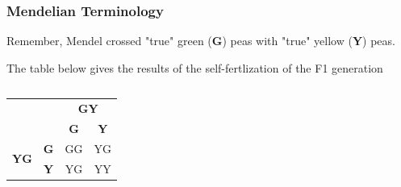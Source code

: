 \documentclass{beamer}
\begin{document}
\begin{frame}
	\frametitle{Mendelian Terminology}

	
	 Remember, Mendel crossed "true" green (\textbf{G}) peas with "true" yellow (\textbf{Y}) peas.

\bigskip

	The table below gives the results of the self-fertlization of the F1 generation\\
	
	\bigskip	
\begin{columns}	
	\begin{column}{0.5\textwidth}


\begin{tabular}{c|c|c|c|}
	\multicolumn{2}{c|}{} & \multicolumn{2}{c|}{\textbf{GY}} \\
	\multicolumn{2}{c|}{} & \textbf{G} & \textbf{Y} \\
	\hline 
	\multirow{2}{*}{\textbf{YG}}	& \textbf{G}& GG& YG \\		
	\cline{2-4} 
	&	\textbf{Y} & YG & YY \\
	\hline
\end{tabular}
	\end{column}

	\begin{column}{0.5\textwidth}

	
	\end{column}
	\end{columns}
	
	
\end{frame}
\end{document}
